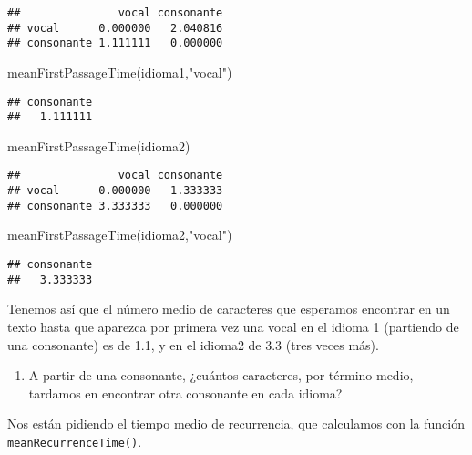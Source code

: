 \documentclass[
]{book}
\newenvironment{Shaded}{\begin{snugshade}}{\end{snugshade}}
\newcommand{\FunctionTok}[1]{\textcolor[rgb]{0.00,0.00,0.00}{#1}}
\newcommand{\NormalTok}[1]{#1}
\newcommand{\StringTok}[1]{\textcolor[rgb]{0.31,0.60,0.02}{#1}}
\providecommand{\tightlist}{%
  \setlength{\itemsep}{0pt}\setlength{\parskip}{0pt}}
\theoremstyle{definition}
\theoremstyle{definition}
\theoremstyle{definition}
\theoremstyle{definition}
\theoremstyle{remark}
\begin{document}
\begin{verbatim}
##               vocal consonante
## vocal      0.000000   2.040816
## consonante 1.111111   0.000000
\end{verbatim}

\begin{Shaded}
\begin{Highlighting}[]
\FunctionTok{meanFirstPassageTime}\NormalTok{(idioma1,}\StringTok{"vocal"}\NormalTok{)}
\end{Highlighting}
\end{Shaded}

\begin{verbatim}
## consonante 
##   1.111111
\end{verbatim}

\begin{Shaded}
\begin{Highlighting}[]
\FunctionTok{meanFirstPassageTime}\NormalTok{(idioma2)}
\end{Highlighting}
\end{Shaded}

\begin{verbatim}
##               vocal consonante
## vocal      0.000000   1.333333
## consonante 3.333333   0.000000
\end{verbatim}

\begin{Shaded}
\begin{Highlighting}[]
\FunctionTok{meanFirstPassageTime}\NormalTok{(idioma2,}\StringTok{"vocal"}\NormalTok{)}
\end{Highlighting}
\end{Shaded}

\begin{verbatim}
## consonante 
##   3.333333
\end{verbatim}

Tenemos así que el número medio de caracteres que esperamos encontrar en un texto hasta que aparezca por primera vez una vocal en el idioma 1 (partiendo de una consonante) es de 1.1, y en el idioma2 de 3.3 (tres veces más).

\begin{enumerate}
\def\labelenumi{\arabic{enumi}.}
\setcounter{enumi}{3}
\tightlist
\item
  A partir de una consonante, ¿cuántos caracteres, por término medio, tardamos en encontrar otra consonante en cada idioma?
\end{enumerate}

Nos están pidiendo el tiempo medio de recurrencia, que calculamos con la función \texttt{meanRecurrenceTime()}.
\end{document}
